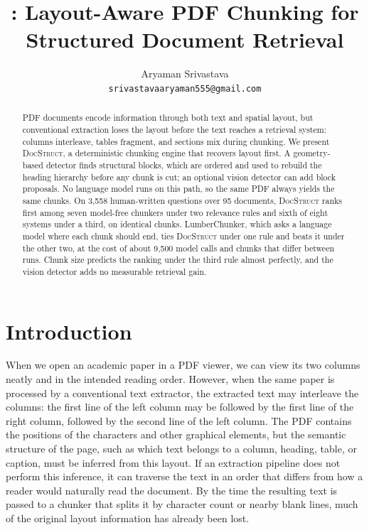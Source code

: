 \documentclass[11pt]{article}
\title{\ds{}: Layout-Aware {PDF} Chunking for Structured Document Retrieval}
\author{
 Aryaman Srivastava \\
  \texttt{srivastavaaryaman555@gmail.com}
}
\newcommand{\ds}{\textsc{DocStruct}}
\begin{document}
\maketitle

\begin{abstract}
PDF documents encode information through both text and spatial layout, but conventional extraction loses the layout before the text reaches a retrieval system: columns interleave, tables fragment, and sections mix during chunking. We present \ds{}, a deterministic chunking engine that recovers layout first. A geometry-based detector finds structural blocks, which are ordered and used to rebuild the heading hierarchy before any chunk is cut; an optional vision detector can add block proposals. No language model runs on this path, so the same PDF always yields the same chunks. On 3{,}558 human-written questions over 95 documents, \ds{} ranks first among seven model-free chunkers under two relevance rules and sixth of eight systems under a third, on identical chunks. LumberChunker, which asks a language model where each chunk should end, ties \ds{} under one rule and beats it under the other two, at the cost of about 9{,}500 model calls and chunks that differ between runs. Chunk size predicts the ranking under the third rule almost perfectly, and the vision detector adds no measurable retrieval gain.
\end{abstract}

\section{Introduction}
\label{sec:intro}

When we open an academic paper in a PDF viewer, we can view its two columns neatly and in the intended reading order. However, when the same paper is processed by a conventional text extractor, the extracted text may interleave the columns: the first line of the left column may be followed by the first line of the right column, followed by the second line of the left column. The PDF contains the positions of the characters and other graphical elements, but the semantic structure of the page, such as which text belongs to a column, heading, table, or caption, must be inferred from this layout. If an extraction pipeline does not perform this inference, it can traverse the text in an order that differs from how a reader would naturally read the document. By the time the resulting text is passed to a chunker that splits it by character count or nearby blank lines, much of the original layout information has already been lost.
\end{document}
